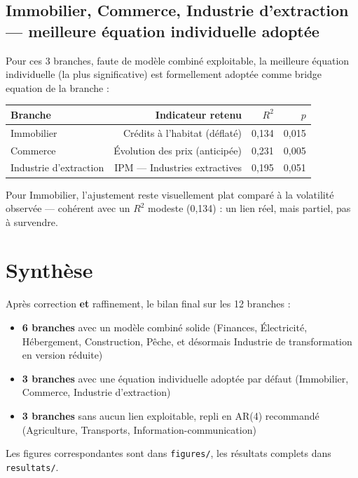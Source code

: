 \documentclass[11pt,a4paper]{article}
\begin{document}
\subsection{Immobilier, Commerce, Industrie d'extraction --- meilleure équation individuelle adoptée}

Pour ces 3 branches, faute de modèle combiné exploitable, la meilleure équation individuelle (la plus significative) est formellement adoptée comme bridge equation de la branche :

\begin{center}
\small
\begin{tabular}{lrrr}
\toprule
\textbf{Branche} & \textbf{Indicateur retenu} & \textbf{$R^2$} & \textbf{$p$} \\
\midrule
Immobilier & Crédits à l'habitat (déflaté) & 0,134 & 0,015 \\
Commerce & Évolution des prix (anticipée) & 0,231 & 0,005 \\
Industrie d'extraction & IPM --- Industries extractives & 0,195 & 0,051 \\
\bottomrule
\end{tabular}
\end{center}

\begin{intuition}
Pour Immobilier, l'ajustement reste visuellement plat comparé à la volatilité observée --- cohérent avec un $R^2$ modeste (0,134) : un lien réel, mais partiel, pas à survendre.
\end{intuition}

\section{Synthèse}

\begin{resultatbox}
Après correction \textbf{et} raffinement, le bilan final sur les 12 branches :
\begin{itemize}[leftmargin=1.3em]
\item \textbf{6 branches} avec un modèle combiné solide (Finances, Électricité, Hébergement, Construction, Pêche, et désormais Industrie de transformation en version réduite)
\item \textbf{3 branches} avec une équation individuelle adoptée par défaut (Immobilier, Commerce, Industrie d'extraction)
\item \textbf{3 branches} sans aucun lien exploitable, repli en AR(4) recommandé (Agriculture, Transports, Information-communication)
\end{itemize}
Les figures correspondantes sont dans \texttt{figures/}, les résultats complets dans \texttt{resultats/}.
\end{resultatbox}
\end{document}

